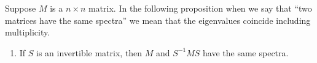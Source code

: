 \documentclass[12pt]{article}
\begin{document}
Suppose $M$ is a $n\times n$ matrix. In the following proposition when we say that
``two matrices have the same spectra'' we mean that the eigenvalues coincide
including multiplicity.

\begin{enumerate}
\item If $S$ is an invertible matrix, then $M$ and $S^{-1} M S$ have
the same spectra. 
\end{enumerate}
\end{document}
